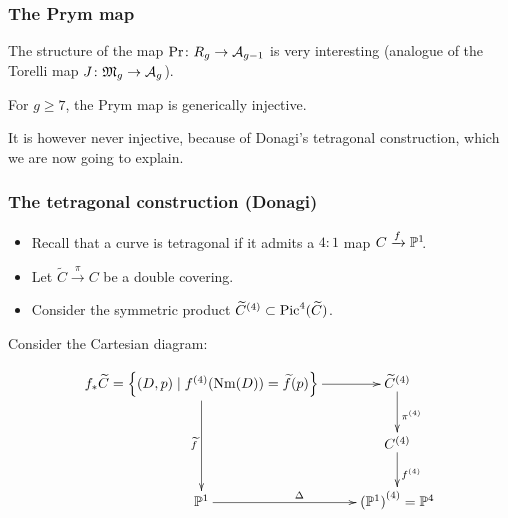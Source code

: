 

\begin{frame}
\frametitle{The Prym map}

The structure of the map $\Pr\colon R_g \to \A_{g-1}$ is very interesting (analogue of the Torelli map $J\colon\mathfrak M_g \to \A_g$).

\pause

\begin{theorem}

For $g \geq 7$, the Prym map is generically injective. 

\end{theorem}
\pause

It is however \alert{never} injective, because of Donagi's \alert{tetragonal construction}, which we are now going to explain.
\end{frame}

\begin{frame}
\frametitle{The tetragonal construction (Donagi)}

\begin{itemize}
	\item Recall that a curve is \alert{tetragonal} if it admits a $4:1$ map $C \xrightarrow{f} \P^1\mkern-4mu$.
	\pause
	\item Let $\widetilde C \xrightarrow{\pi} C$ be a double covering.
	\pause
	\item Consider the symmetric product ${\widetilde C}^{(4)} \subset \Pic^4(\widetilde C)$.
\end{itemize}
\pause

Consider the Cartesian diagram:

\[
\xymatrix{
f_\ast \widetilde C = \left\{ (D,p) \mid f^{(4)}(\Nm(D)) = \widetilde f (p) \right\} \ar[r] \ar[dd]_{\widetilde f} & {\widetilde C}^{(4)} \ar[d]^{\pi^{(4)}} \\
 & C^{(4)} \ar[d]^{f^{(4)}} \\
\P^1 \ar[r]^\Delta & {(\P^1)}^{(4)} = \P^4
}
\]
\end{frame}

